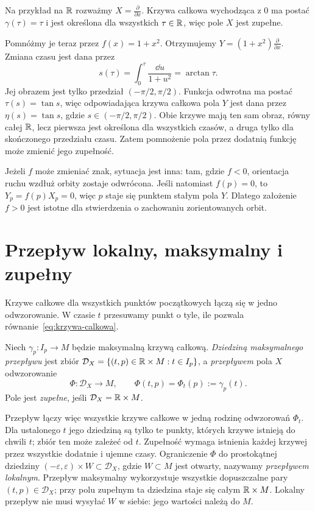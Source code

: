 \begin{przyklad}
Na przykład na $\mathbb{R}$ rozważmy $X=\frac{\partial}{\partial x}$.
Krzywa całkowa wychodząca z $0$ ma postać $\gamma(\tau)=\tau$
i jest określona dla wszystkich $\tau\in\mathbb{R}$, więc pole $X$ jest zupełne.

Pomnóżmy je teraz przez $f(x)=1+x^2$. Otrzymujemy
$Y=(1+x^2)\frac{\partial}{\partial x}$.
Zmiana czasu jest dana przez
\[
s(\tau)=\int_0^\tau\frac{\dd u}{1+u^2}=\arctan\tau.
\]
Jej obrazem jest tylko przedział $(-\pi/2,\pi/2)$.
Funkcja odwrotna ma postać $\tau(s)=\tan s$, więc odpowiadająca
krzywa całkowa pola $Y$ jest dana przez
$\eta(s)=\tan s$, gdzie $s\in(-\pi/2,\pi/2)$.
Obie krzywe mają ten sam obraz, równy całej $\mathbb{R}$, lecz pierwsza jest
określona dla wszystkich czasów, a druga tylko dla skończonego
przedziału czasu. Zatem pomnożenie pola przez dodatnią funkcję może
zmienić jego zupełność.

Jeżeli $f$ może zmieniać znak, sytuacja jest inna: tam, gdzie $f<0$,
orientacja ruchu wzdłuż orbity zostaje odwrócona. Jeśli natomiast
$f(p)=0$, to $Y_p=f(p)X_p=0$, więc $p$ staje się punktem stałym
pola $Y$. Dlatego założenie $f>0$ jest istotne dla stwierdzenia
o zachowaniu zorientowanych orbit.
\end{przyklad}


\section{Przepływ lokalny, maksymalny i zupełny}
\label{sec:przeplyw}

Krzywe całkowe dla wszystkich punktów początkowych łączą się
w jedno odwzorowanie. W czasie $t$ przesuwamy punkt o tyle, ile
pozwala równanie~\eqref{eq:krzywa-calkowa}.

\begin{definicja}
Niech $\gamma_p\colon I_p\to M$ będzie maksymalną krzywą całkową.
\emph{Dziedziną maksymalnego przepływu} jest zbiór
$\mathcal D_X=\{(t,p)\in\mathbb{R}\times M:t\in I_p\}$, a
\emph{przepływem} pola $X$ odwzorowanie
\[
 \Phi\colon\mathcal D_X\to M,\qquad \Phi(t,p)=\Phi_t(p):=\gamma_p(t).
\]
Pole jest \emph{zupełne}, jeśli $\mathcal D_X=\mathbb{R}\times M$.
\end{definicja}

Przepływ łączy więc wszystkie krzywe całkowe w jedną rodzinę
odwzorowań $\Phi_t$. Dla ustalonego $t$ jego dziedziną są tylko
te punkty, których krzywe istnieją do chwili $t$; zbiór ten
może zależeć od $t$. Zupełność wymaga istnienia każdej krzywej
przez wszystkie dodatnie i ujemne czasy.
Ograniczenie $\Phi$ do prostokątnej dziedziny
$(-\varepsilon,\varepsilon)\times W\subset\mathcal D_X$,
gdzie $W\subset M$ jest otwarty, nazywamy \emph{przepływem lokalnym}.
Przepływ maksymalny wykorzystuje wszystkie dopuszczalne pary
$(t,p)\in\mathcal D_X$; przy polu zupełnym ta dziedzina staje się
całym $\mathbb{R}\times M$. Lokalny przepływ nie musi wysyłać $W$ w siebie:
jego wartości należą do $M$.

